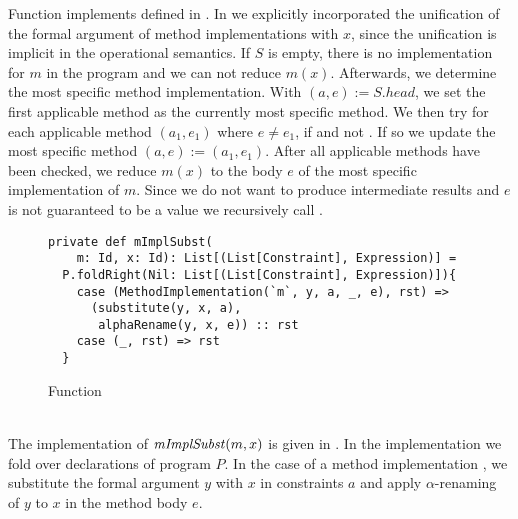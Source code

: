 Function  implements 
defined in .
In  we explicitly incorporated the unification
of the formal argument of method implementations with $x$,
since the unification is implicit in the operational semantics.
If $S$ is empty, there is no implementation for $m$ in the program
and we can not reduce $m(x)$.
Afterwards, we determine the most specific method implementation.
With $(a, e) := S.head$, we set the first applicable method
as the currently most specific method.
We then try for each applicable method $(a_1, e_1)$ where $e \not= e_1$,
if  and not .
If so we update the most specific method $(a, e) := (a_1, e_1)$.
After all applicable methods have been checked, we reduce
$m(x)$ to the body $e$ of the most specific implementation of $m$.
Since we do not want to produce intermediate results and $e$
is not guaranteed to be a value we recursively call .
%
\begin{figure}[h]
\begin{lstlisting}
private def mImplSubst(
    m: Id, x: Id): List[(List[Constraint], Expression)] =
  P.foldRight(Nil: List[(List[Constraint], Expression)]){
    case (MethodImplementation(`m`, y, a, _, e), rst) =>
      (substitute(y, x, a),
       alphaRename(y, x, e)) :: rst
    case (_, rst) => rst
  }
\end{lstlisting}
\caption{Function }
\label{fig:scala-mimpl}
\end{figure}\\
%
The implementation of $\mathit{mImplSubst}(m, x)$ is given in .
In the implementation we fold over declarations of program $P$.
In the case of a method implementation ,
we substitute the formal argument $y$ with $x$ in constraints $a$
and apply $\alpha$-renaming of $y$ to $x$ in the method body $e$.


